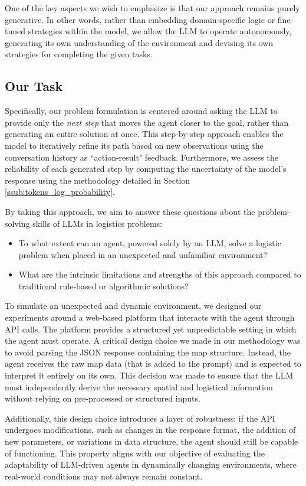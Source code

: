 One of the key aspects we wish to emphasize is that our approach remains purely
generative. In other words, rather than embedding domain-specific logic or fine-tuned
strategies within the model, we allow the LLM to operate autonomously,
generating its own understanding of the environment and devising its own
strategies for completing the given tasks.

\subsection{Our Task}
Specifically, our problem formulation is centered around asking the LLM to provide
only the \emph{next step} that moves the agent closer to the goal, rather than generating
an entire solution at once. This step-by-step approach enables the model to
iteratively refine its path based on new observations using the conversation
history as ``action-result" feedback. Furthermore, we assess the reliability of each
generated step by computing the uncertainty of the model's response using the methodology
detailed in Section \ref{ssub:tokens_log_probability}.

By taking this approach, we aim to answer these questions about the problem-solving
skills of LLMs in logistics problems:
\begin{itemize}
  \item To what extent can an agent, powered solely by an LLM, solve a logistic problem
    when placed in an unexpected and unfamiliar environment?

  \item What are the intrinsic limitations and strengths of this approach compared
    to traditional rule-based or algorithmic solutions?
\end{itemize}

To simulate an unexpected and dynamic environment, we designed our experiments around
a web-based platform that interacts with the agent through API calls. The
platform provides a structured yet unpredictable setting in which the agent must
operate. A critical design choice we made in our methodology was to avoid parsing
the JSON response containing the map structure. Instead, the agent receives the raw
map data (that is added to the prompt) and is expected to interpret it entirely on
its own. This decision was made to ensure that the LLM must independently derive
the necessary spatial and logistical information without relying on pre-processed
or structured inputs.

Additionally, this design choice introduces a layer of robustness: if the API
undergoes modifications, such as changes in the response format, the addition of
new parameters, or variations in data structure, the agent should still be
capable of functioning. This property aligns with our objective of evaluating the
adaptability of LLM-driven agents in dynamically changing environments, where
real-world conditions may not always remain constant.

